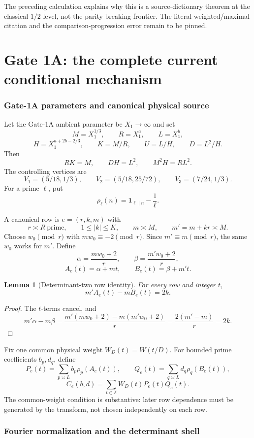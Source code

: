 \documentclass[11pt]{article}
\newtheorem{lemma}[theorem]{Lemma}
\theoremstyle{definition}
\theoremstyle{remark}
\newcommand{\1}{\mathbf 1}
\begin{document}
The preceding calculation explains why this is a source-dictionary theorem at the classical $1/2$ level,
not the parity-breaking frontier.  The literal weighted/maximal citation and the comparison-progression error
remain to be pinned.

\part{Gate 1A: the complete current conditional mechanism}

\section{Gate-1A parameters and canonical physical source}

Let the Gate-1A ambient parameter be $X_1\to\infty$ and set
\[
 M=X_1^{1/3},\qquad R=X_1^a,\qquad L=X_1^b,
\]
\[
 H=X_1^{a+2b-2/3},\qquad K=M/R,\qquad U=L/H,\qquad D=L^2/H.
\]
Then
\[
 RK=M,\qquad DH=L^2,\qquad M^2H=RL^2.
\tag{1A-scale}
\]
The controlling vertices are
\[
 V_1=(5/18,1/3),\qquad V_2=(5/18,25/72),\qquad V_3=(7/24,1/3).
\]
For a prime $\ell$, put
\[
 \rho_\ell(n)=\1_{\ell\mid n}-\frac1\ell.
\]

A canonical row is $e=(r,k,m)$ with
\[
 r\asymp R\ \text{prime},\qquad1\le|k|\le K,\qquad m\asymp M,
 \qquad m'=m+kr\asymp M.
\]
Choose $w_0\pmod r$ with $mw_0\equiv-2\pmod r$.  Since $m'\equiv m\pmod r$, the same $w_0$ works for $m'$.
Define
\[
 \alpha=\frac{mw_0+2}{r},\qquad \beta=\frac{m'w_0+2}{r},
\]
\[
 A_e(t)=\alpha+mt,\qquad B_e(t)=\beta+m't.
\]

\begin{lemma}[Determinant-two row identity]\label{lem:det2}
For every row and integer $t$,
\[
 \boxed{m'A_e(t)-mB_e(t)=2k.}
\tag{1A-det}
\]
\end{lemma}
\begin{proof}
The $t$-terms cancel, and
\[
 m'\alpha-m\beta
 =\frac{m'(mw_0+2)-m(m'w_0+2)}r
 =\frac{2(m'-m)}r=2k.
\]
\end{proof}

Fix one common physical weight $W_D(t)=W(t/D)$.  For bounded prime coefficients $b_p,d_q$, define
\[
 P_e(t)=\sum_{p\asymp L}b_p\rho_p(A_e(t)),\qquad
 Q_e(t)=\sum_{q\asymp L}d_q\rho_q(B_e(t)),
\]
\[
 C_e(b,d)=\sum_{t\in\mathbb Z}W_D(t)P_e(t)Q_e(t).
\tag{1A-source}
\]
The common-weight condition is substantive: later row dependence must be generated by the transform, not chosen
independently on each row.

\section{Fourier normalization and the determinant shell}
\end{document}
